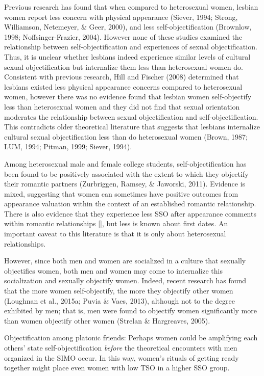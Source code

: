 \documentclass[man]{apa6}
\begin{document}
Previous research has found that when compared to heterosexual women,
lesbian women report less concern with physical appearance (Siever,
1994; Strong, Williamson, Netemeyer, \& Geer, 2000), and less
self-objectification (Brownlow, 1998; Noffsinger-Frazier, 2004). However
none of these studies examined the relationship between
self-objectification and experiences of sexual objectification. Thus, it
is unclear whether lesbians indeed experience similar levels of cultural
sexual objectification but internalize them less than heterosexual women
do. Consistent with previous research, Hill and Fischer (2008)
determined that lesbians existed less physical appearance concerns
compared to heterosexual women, however there was no evidence found that
lesbian women self-objectify less than heterosexual women and they did
not find that sexual orientation moderates the relationship between
sexual objectification and self-objectification. This contradicts older
theoretical literature that suggests that lesbians internalize cultural
sexual objectification less than do heterosexual women (Brown, 1987;
LUM, 1994; Pitman, 1999; Siever, 1994).

Among heterosexual male and female college students,
self-objectification has been found to be positively associated with the
extent to which they objectify their romantic partners (Zurbriggen,
Ramsey, \& Jaworski, 2011). Evidence is mixed, suggesting that women can
sometimes have positive outcomes from appearance valuation within the
context of an established romantic relationship. There is also evidence
that they experience less SSO after appearance comments within romantic
relationships {[}{]}, but less is known about first dates. An important
caveat to this literature is that it is only about heterosexual
relationships.

However, since both men and women are socialized in a culture that
sexually objectifies women, both men and women may come to internalize
this socialization and sexually objectify women. Indeed, recent research
has found that the more women self-objectify, the more they objectify
other women (Loughnan et al., 2015a; Puvia \& Vaes, 2013), although not
to the degree exhibited by men; that is, men were found to objectify
women significantly more than women objectify other women (Strelan \&
Hargreaves, 2005).

Objectification among platonic friends: Perhaps women could be
amplifying each others' state self-objectification \emph{before} the
theoretical encounters with men organized in the SIMO occur. In this
way, women's rituals of getting ready together might place even women
with low TSO in a higher SSO group.
\end{document}
